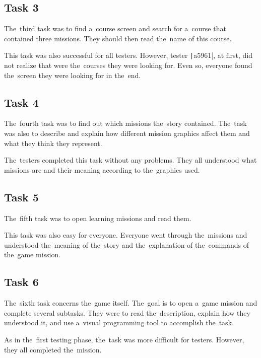 \subsection*{Task 3}

The~third task was to find a~course screen and search for a~course that contained three missions.
They should then read the~name of this course.

This task was also successful for all testers.
However, tester \texttt|a5961|, at first, did not realize that  were the~courses they were looking for.
Even so, everyone found the~screen they were looking for in the~end.

\subsection*{Task 4}

The~fourth task was to find out which missions the~story contained.
The~task was also to describe and explain how different mission graphics affect them and what they think they represent.

The~testers completed this task without any problems.
They all understood what missions are and their meaning according to the~graphics used.

\subsection*{Task 5}

The~fifth task was to open learning missions and read them.

This task was also easy for everyone.
Everyone went through the~missions and understood the~meaning of the~story and the~explanation of the~commands of the~game mission.

\subsection*{Task 6}

The~sixth task concerns the~game itself.
The~goal is to open a~game mission and complete several subtasks.
They were to read the~description, explain how they understood it, and use a~visual programming tool to accomplish the~task.

As in the~first testing phase, the~task was more difficult for testers.
\linebreak
However, they all completed the~mission.

\pagebreak

